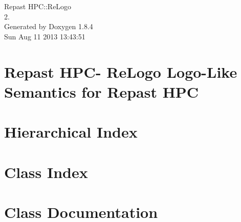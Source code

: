 \documentclass[twoside]{book}
\newcommand{\clearemptydoublepage}{%
  \newpage{\pagestyle{empty}\cleardoublepage}%
}
\begin{document}
\hypersetup{pageanchor=false}
\begin{titlepage}
\vspace*{7cm}
\begin{center}%
{\Large Repast H\-P\-C\-:\-:Re\-Logo \\[1ex]\large 2. }\\
\vspace*{1cm}
{\large Generated by Doxygen 1.8.4}\\
\vspace*{0.5cm}
{\small Sun Aug 11 2013 13:43:51}\\
\end{center}
\end{titlepage}
\clearemptydoublepage
\tableofcontents
\clearemptydoublepage
{}
\hypersetup{pageanchor=true}

\chapter{Repast H\-P\-C-\/ Re\-Logo Logo-\/\-Like Semantics for Repast H\-P\-C}
\label{index}\hypertarget{index}{}
\chapter{Hierarchical Index}

\chapter{Class Index}

\chapter{Class Documentation}


























\newpage
{}
{}
\printindex
\end{document}
